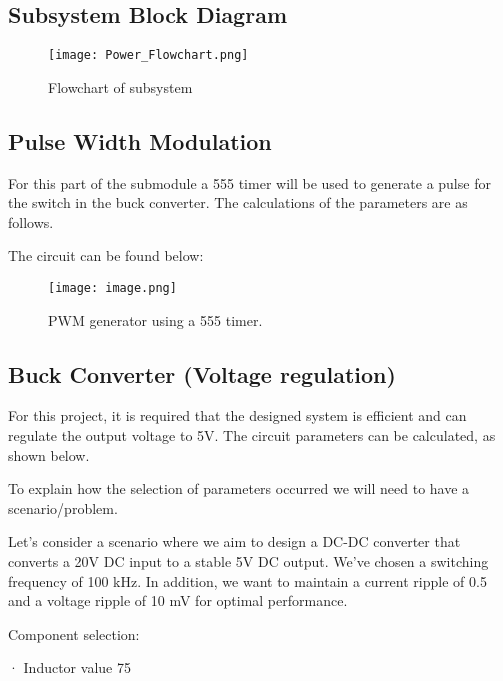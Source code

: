 \documentclass[class=report,11pt,crop=false]{standalone}
\begin{document}
\subsection{Subsystem Block Diagram}

 \begin{figure}
     \centering
     \texttt{[image: Power\_Flowchart.png]}
     \caption{Flowchart of subsystem}
     \label{fig:enter-label1}
 \end{figure}

\subsection{Pulse Width Modulation}

For this part of the submodule a 555 timer will be used to generate a pulse for the switch in the buck converter. The calculations of the parameters are as follows.

The circuit can be found below:
\begin{figure}
    \centering
    \texttt{[image: image.png]}
    \caption{PWM generator using a 555 timer.}
    \label{fig:enter-label2}
\end{figure}


\subsection{Buck Converter (Voltage regulation)}

For this project, it is required that the designed system is efficient and can regulate the output voltage to 5V. The circuit parameters can be calculated, as shown below.

To explain how the selection of parameters occurred we will need to have a scenario/problem. 

Let's consider a scenario where we aim to design a DC-DC converter that converts a 20V DC input to a stable 5V DC output. We've chosen a switching frequency of 100 kHz. In addition, we want to maintain a current ripple of 0.5 and a voltage ripple of 10 mV for optimal performance.

 

 

 

 

 

 

 Component selection:

· Inductor value 75 
\end{document}
